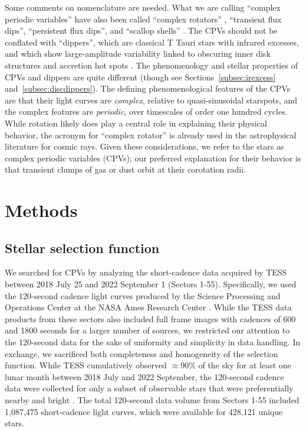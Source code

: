 \documentclass[11pt,twocolumn,tighten]{aastex63}
\begin{document}
Some comments on nomenclature are needed.  What we are calling
``complex periodic variables'' \citep{2023MNRAS.518.2921K} have also
been called ``complex rotators''
\citep{2019ApJ...876..127Z,2022AJ....163..144G,2023ApJ...945..114P},
``transient flux dips'', ``persistent flux dips'', and ``scallop
shells'' \citep{2017AJ....153..152S}.  The CPVs should not be conflated
with ``dippers'', which are classical T Tauri stars with infrared
excesses, and which show large-amplitude variability linked to
obscuring inner disk structures and accretion hot spots
\citep{2014AJ....147...82C,2021ApJ...908...16R}.  The phenomenology
and stellar properties of CPVs and dippers are quite different (though
see Sections~\ref{subsec:irexcess} and~\ref{subsec:discdippers}).  The
defining phenomenological features of the CPVs are that their
light curves are {\it complex}, relative to quasi-sinusoidal
starspots, and the complex features are {\it periodic}, over
timescales of order one hundred cycles.  While rotation likely
does play a central role in explaining their physical behavior, the
acronym for ``complex rotator'' is already used in the astrophysical
literature for cosmic rays.  Given these
considerations, we refer to the stars as complex periodic variables
(CPVs); our preferred explanation for their behavior is that transient
clumps of gas or dust orbit at their corotation radii.


\section{Methods}
\label{sec:methods}

\subsection{Stellar selection function}
\label{subsec:selectionfn}

We searched for CPVs by analyzing the short-cadence data acquired
by TESS between 2018 July 25 and 2022 September 1 (Sectors 1-55).
Specifically, we used the 120-second cadence light curves produced by
the Science Processing and Operations Center at the NASA Ames Research
Center \citep{2016SPIE.9913E..3EJ}.  While the TESS data products from
these sectors also included full frame images with cadences of 600 and
1800 seconds for a larger number of sources, we restricted our
attention to the 120-second data for the sake of uniformity and
simplicity in data handling.  In exchange, we sacrificed both
completeness and homogeneity of the selection function.  While TESS
cumulatively observed $\approx$90\% of the sky for at least one lunar
month between 2018 July and 2022 September, the 120-second cadence
data were collected for only a subset of observable stars that were
preferentially nearby and bright \citep[see][]{2021PASP..133i5002F}.
The total 120-second data volume
from Sectors 1-55 included 1{,}087{,}475 short-cadence light curves, which were
available for 428{,}121 unique stars.
\end{document}
